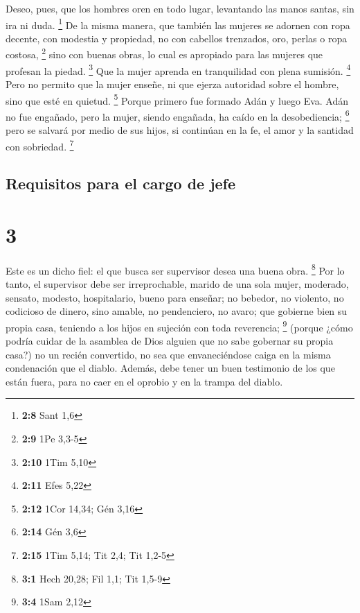  Deseo, pues, que los hombres oren en todo lugar,
levantando las manos santas, sin ira ni duda. \footnote{\textbf{2:8}
  Sant 1,6}  De la misma manera, que también las mujeres
se adornen con ropa decente, con modestia y propiedad, no con cabellos
trenzados, oro, perlas o ropa costosa, \footnote{\textbf{2:9} 1Pe 3,3-5}
 sino con buenas obras, lo cual es apropiado para las
mujeres que profesan la piedad. \footnote{\textbf{2:10} 1Tim 5,10}
 Que la mujer aprenda en tranquilidad con plena sumisión.
\footnote{\textbf{2:11} Efes 5,22}  Pero no permito que
la mujer enseñe, ni que ejerza autoridad sobre el hombre, sino que esté
en quietud. \footnote{\textbf{2:12} 1Cor 14,34; Gén 3,16}
 Porque primero fue formado Adán y luego Eva.
 Adán no fue engañado, pero la mujer, siendo engañada, ha
caído en la desobediencia; \footnote{\textbf{2:14} Gén 3,6}
 pero se salvará por medio de sus hijos, si continúan en
la fe, el amor y la santidad con sobriedad. \footnote{\textbf{2:15} 1Tim
  5,14; Tit 2,4; Tit 1,2-5}

\hypertarget{requisitos-para-el-cargo-de-jefe}{%
\subsection{Requisitos para el cargo de
jefe}\label{requisitos-para-el-cargo-de-jefe}}

\hypertarget{section-2}{%
\section{3}\label{section-2}}

 Este es un dicho fiel: el que busca ser supervisor desea
una buena obra. \footnote{\textbf{3:1} Hech 20,28; Fil 1,1; Tit 1,5-9}
 Por lo tanto, el supervisor debe ser irreprochable,
marido de una sola mujer, moderado, sensato, modesto, hospitalario,
bueno para enseñar;  no bebedor, no violento, no codicioso
de dinero, sino amable, no pendenciero, no avaro;  que
gobierne bien su propia casa, teniendo a los hijos en sujeción con toda
reverencia; \footnote{\textbf{3:4} 1Sam 2,12}  (porque
¿cómo podría cuidar de la asamblea de Dios alguien que no sabe gobernar
su propia casa?)  no un recién convertido, no sea que
envaneciéndose caiga en la misma condenación que el diablo.
 Además, debe tener un buen testimonio de los que están
fuera, para no caer en el oprobio y en la trampa del diablo.

